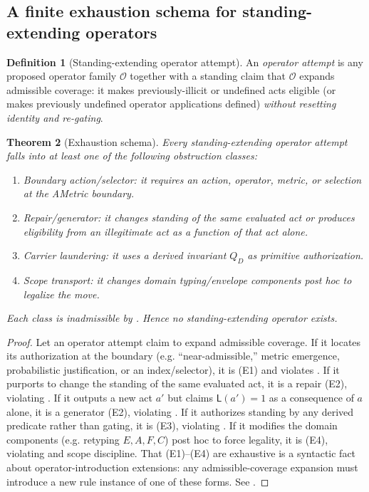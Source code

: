\documentclass[11pt]{article}
\newtheorem{theorem}{Theorem}[section]
\theoremstyle{definition}
\newtheorem{definition}[theorem]{Definition}
\newcommand{\Stand}{\mathsf{L}}
\begin{document}
\subsection{A finite exhaustion schema for standing-extending operators}

\begin{definition}[Standing-extending operator attempt]
An \emph{operator attempt} is any proposed operator family $\mathcal{O}$ together with a standing claim that $\mathcal{O}$ expands admissible coverage: it makes previously-illicit or undefined acts eligible (or makes previously undefined operator applications defined) \emph{without resetting identity and re-gating}.
\end{definition}

\begin{theorem}[Exhaustion schema]
\label{thm:exhaustion-schema}
Every standing-extending operator attempt falls into at least one of the following obstruction classes:
\begin{enumerate}[label=\textbf{(E\arabic*)}, leftmargin=2.6em]
\item \emph{Boundary action/selector}: it requires an action, operator, metric, or selection at the AMetric boundary.
\item \emph{Repair/generator}: it changes standing of the same evaluated act or produces eligibility from an illegitimate act as a function of that act alone.
\item \emph{Carrier laundering}: it uses a derived invariant $Q_D$ as primitive authorization.
\item \emph{Scope transport}: it changes domain typing/envelope components post hoc to legalize the move.
\end{enumerate}
Each class is inadmissible by .
Hence no standing-extending operator exists.
\end{theorem}

\begin{proof}
Let an operator attempt claim to expand admissible coverage.
If it locates its authorization at the boundary (e.g. ``near-admissible,'' metric emergence, probabilistic justification, or an index/selector), it is (E1) and violates .
If it purports to change the standing of the same evaluated act, it is a repair (E2), violating .
If it outputs a new act $a'$ but claims $\Stand(a')=1$ as a consequence of $a$ alone, it is a generator (E2), violating .
If it authorizes standing by any derived predicate rather than gating, it is (E3), violating .
If it modifies the domain components (e.g. retyping $E,A,F,C$) post hoc to force legality, it is (E4), violating  and scope discipline.
That (E1)--(E4) are exhaustive is a syntactic fact about operator-introduction extensions: any admissible-coverage expansion must introduce a new rule instance of one of these forms. See .
\end{proof}
\end{document}
